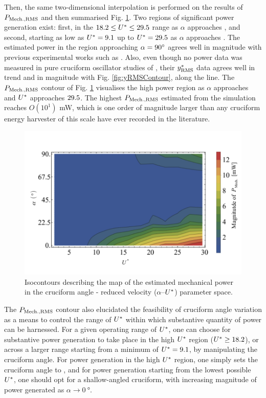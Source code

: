 \documentclass[oneside]{utmthesis}
\begin{document}
Then, the same two-dimensional interpolation is performed on the results of $P_{\text{Mech.,RMS}}$ and then summarised Fig. \ref{fig:mechanicalPowerContour}. Two regions of significant power generation exist: first, in the $18.2 \leq U^{*} \leq 29.5$ range as $\alpha$ approaches \angfi{}, and second, starting as low as $U^{*} = 9.1$ up to $U^{*} = 29.5$ as $\alpha$ approaches \angon{}. The estimated power in the region approaching $\alpha = \angfi{}$ agrees well in magnitude with previous experimental works such as \citet{Koide2013}. Also, even though no power data was measured in pure cruciform oscillator studies of \citet{Koide2009,Nguyen2012}, their $y^{*}_{\text{RMS}}$ data agrees well in trend and in magnitude with Fig. \ref{fig:yRMSContour}, along the \angfi{} line. The $P_{\text{Mech.,RMS}}$ contour of Fig. \ref{fig:mechanicalPowerContour} visualises the high power region as $\alpha$ approaches \angon{} and $U^{*}$ approaches $29.5$. The highest $P_{\text{Mech.,RMS}}$ estimated from the simulation reaches $O(10^{1})$ \si{\milli\watt}, which is one order of magnitude larger than any cruciform energy harvester of this scale have ever recorded in the literature.

\begin{figure}[H]
  \centering
  \includegraphics[width=1\textwidth]{figs/mechanicalPowerContours}
  \caption{Isocontours describing the map of the estimated mechanical power in the cruciform angle - reduced velocity ($\alpha$--$U^{*}$) parameter space.}
  \label{fig:mechanicalPowerContour}
\end{figure}

The $P_{\text{Mech.,RMS}}$ contour also elucidated the feasibility of cruciform angle variation as a means to control the range of $U^{*}$ within which substantive quantity of power can be harnessed. For a given operating range of $U^{*}$, one can choose for substantive power generation to take place in the high $U^{*}$ region ($U^{*} \geq 18.2$), or across a larger range starting from a minimum of $U^{*} = 9.1$, by manipulating the cruciform angle. For power generation in the high $U^{*}$ region, one simply sets the cruciform angle to \angfi{}, and for power generation starting from the lowest possible $U^{*}$, one should opt for a shallow-angled cruciform, with increasing magnitude of power generated as $\alpha \rightarrow \SI{0}{\degree}$.
\end{document}
